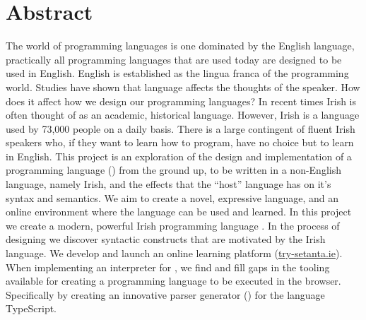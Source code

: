 \chapter{Abstract}
The world of programming languages is one dominated by the English language, practically all programming languages that are used today are designed to be used in English. English is established as the lingua franca of the programming world.
Studies have shown that language affects the thoughts of the speaker\cite{languagecolour}. How does it affect how we design our programming languages?
In recent times Irish is often thought of as an academic, historical language. However, Irish is a language used by 73,000 people on a daily basis. There is a large contingent of fluent Irish speakers who, if they want to learn how to program, have no choice but to learn in English.
This project is an exploration of the design and implementation of a programming language (\Setanta{}) from the ground up, to be written in a non-English language, namely Irish, and the effects that the ``host'' language has on it's syntax and semantics. We aim to create a novel, expressive language, and an online environment where the language can be used and learned.
In this project we create a modern, powerful Irish programming language \Setanta{}. In the process of designing \Setanta{} we discover syntactic constructs that are motivated by the Irish language. We develop and launch an online learning platform (\href{https://try-setanta.ie}{try-setanta.ie}). When implementing an interpreter for \Setanta{}, we find and fill gaps in the tooling available for creating a programming language to be executed in the browser. Specifically by creating an innovative parser generator (\tsPEG{}) for the language TypeScript.
